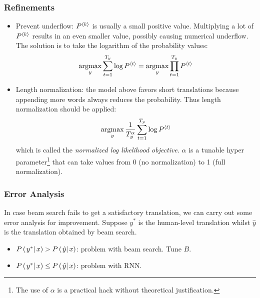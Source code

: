 \subsubsection{Refinements}
\begin{itemize}
\item Prevent underflow: $P^{\left\langle k\right\rangle}$ is usually a small positive value. Multiplying a lot of $P^{\left\langle k\right\rangle}$ results in an even smaller value, possibly causing numerical underflow. The solution is to take the logarithm of the probability values:
\[\displaystyle\operatorname*{\arg\!\max}_{y}\displaystyle\sum_{t=1}^{T_y}\log P^{\left\langle t\right\rangle}=\displaystyle\operatorname*{\arg\!\max}_{y}\displaystyle\prod_{t=1}^{T_y}P^{\left\langle t\right\rangle}\]
\item Length normalization: the model above favors short translations because appending more words always reduces the probability. Thus length normalization should be applied:
\[\displaystyle\operatorname*{\arg\!\max}_{y}\frac{1}{T_y^{\alpha}}\displaystyle\sum_{t=1}^{T_y}\log P^{\left\langle t\right\rangle}\]
which is called the \textit{normalized log likelihood objective}. $\alpha$ is a tunable hyper parameter\footnote{The use of $\alpha$ is a practical hack without theoretical justification.} that can take values from 0 (no normalization) to 1 (full normalization).
\end{itemize} 
\subsubsection{Error Analysis}
In case beam search fails to get a satisfactory translation, we can carry out some error analysis for improvement. Suppose $y^*$ is the human-level translation whilst $\hat{y}$ is the translation obtained by beam search. 
\begin{itemize}
  \item $P\left(\left.y^*\right\vert x\right)>P\left(\left.\hat{y}\right\vert x\right)$: problem with beam search. Tune $B$.
  \item $P\left(\left.y^*\right\vert x\right)\le P\left(\left.\hat{y}\right\vert x\right)$: problem with RNN.
\end{itemize} 
